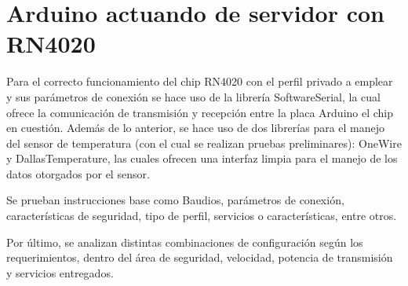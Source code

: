 \section{Arduino actuando de servidor con RN4020}

Para el correcto funcionamiento del chip RN4020 con el perfil privado a emplear y sus parámetros de conexión se hace uso de la librería SoftwareSerial, la cual ofrece la comunicación de transmisión y recepción entre la placa Arduino el chip en cuestión.
Además de lo anterior, se hace uso de dos librerías para el manejo del sensor de temperatura (con el cual se realizan pruebas preliminares): OneWire y DallasTemperature, las cuales ofrecen una interfaz limpia para el manejo de los datos otorgados por el sensor.

Se prueban instrucciones base como Baudios, parámetros de conexión, características de seguridad, tipo de perfil, servicios o características, entre otros.

Por último, se analizan distintas combinaciones de configuración según los requerimientos, dentro del área de seguridad, velocidad, potencia de transmisión y servicios entregados.

